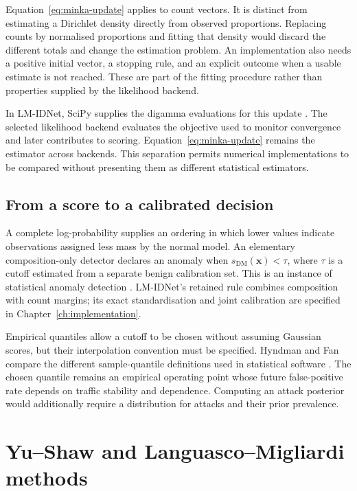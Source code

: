 Equation~\eqref{eq:minka-update} applies to count vectors. It is distinct
from estimating a Dirichlet density directly from observed proportions.
Replacing counts by normalised proportions and fitting that density would
discard the different totals and change the estimation problem. An
implementation also needs a positive initial vector, a stopping rule, and
an explicit outcome when a usable estimate is not reached. These are part
of the fitting procedure rather than properties supplied by the likelihood
backend.

In LM-IDNet, SciPy supplies the digamma evaluations for this update
\cite{virtanen2020}. The selected likelihood backend evaluates the
objective used to monitor convergence and later contributes to scoring.
Equation~\eqref{eq:minka-update} remains the estimator across backends. This
separation permits numerical implementations to be compared without
presenting them as different statistical estimators.

\subsection{From a score to a calibrated decision}

A complete log-probability supplies an ordering in which lower values
indicate observations assigned less mass by the normal model. An
elementary composition-only detector declares an anomaly when
$s_{\mathrm{DM}}(\boldsymbol{x})<\tau$, where $\tau$ is a cutoff estimated
from a separate benign calibration set. This is an instance of statistical
anomaly detection \cite{chandola2009}. LM-IDNet's retained rule combines
composition with count margins; its exact standardisation and joint
calibration are specified in Chapter~\ref{ch:implementation}.

Empirical quantiles allow a cutoff to be chosen without assuming Gaussian
scores, but their interpolation convention must be specified. Hyndman and
Fan compare the different sample-quantile definitions used in statistical
software \cite{hyndman1996}. The chosen quantile remains an empirical
operating point whose future false-positive rate depends on traffic
stability and dependence. Computing an attack posterior would additionally
require a distribution for attacks and their prior prevalence.

\section{Yu--Shaw and Languasco--Migliardi methods}
\label{sec:background-numerics}

